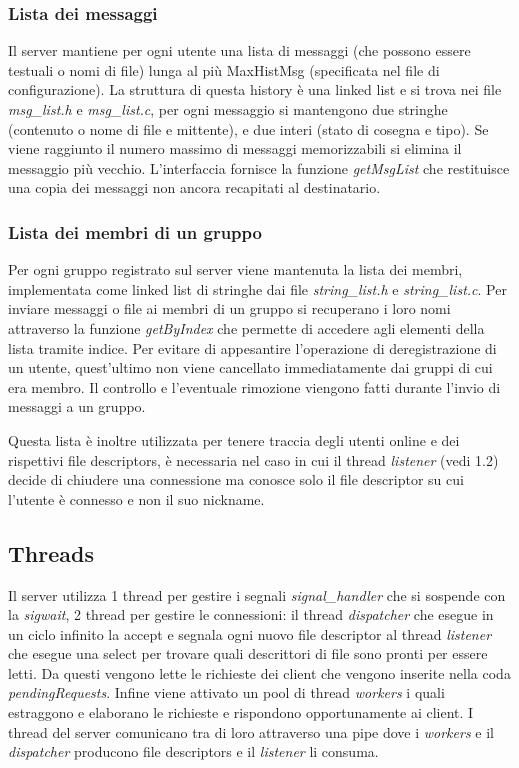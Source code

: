\documentclass[11pt]{article}
\begin{document}
\subsubsection{Lista dei messaggi}
Il server mantiene per ogni utente una lista di messaggi (che possono essere testuali o nomi di file) lunga al più MaxHistMsg (specificata nel file di configurazione). La struttura di questa  history è una linked list e si trova nei file \emph{msg\_list.h} e \emph{msg\_list.c}, per ogni messaggio si mantengono due stringhe (contenuto o nome di file e mittente), e due interi (stato di cosegna e tipo). Se viene raggiunto il numero massimo di messaggi memorizzabili si elimina il messaggio più vecchio. L'interfaccia fornisce la funzione \emph{getMsgList} che restituisce una copia dei messaggi non ancora recapitati al destinatario.

\subsubsection{Lista dei membri di un gruppo}
Per ogni gruppo registrato sul server viene mantenuta la lista dei membri, implementata come linked list di stringhe dai file \emph{string\_list.h} e \emph{string\_list.c}. Per inviare messaggi o file ai membri di un gruppo si recuperano i loro nomi attraverso la funzione \emph{getByIndex} che permette di accedere agli elementi della lista tramite indice. Per evitare di appesantire l'operazione di deregistrazione di un utente, quest'ultimo non viene cancellato immediatamente dai gruppi di cui era membro. Il controllo e l'eventuale rimozione viengono fatti durante l'invio di messaggi a un gruppo.

Questa lista è inoltre utilizzata per tenere traccia degli utenti online e dei rispettivi file descriptors, è necessaria nel caso in cui il thread \emph{listener} (vedi 1.2) decide di chiudere una connessione ma conosce solo il file descriptor su cui l'utente è connesso e non il suo nickname.

\subsection{Threads}
Il server utilizza 1 thread per gestire i segnali \emph{signal\_handler} che si sospende con la \emph{sigwait}, 2 thread per gestire le connessioni: il thread \emph{dispatcher} che esegue in un ciclo infinito la accept e segnala ogni nuovo file descriptor al thread \emph{listener} che esegue una select per trovare quali descrittori di file sono pronti per essere letti. Da questi vengono lette le richieste dei client che vengono inserite nella coda \emph{pendingRequests}. Infine viene attivato un pool di thread \emph{workers} i quali estraggono e elaborano le richieste e rispondono opportunamente ai client. I thread del server comunicano tra di loro attraverso una pipe dove i \emph{workers} e il \emph{dispatcher} producono file descriptors e il \emph{listener} li consuma.
\end{document}
